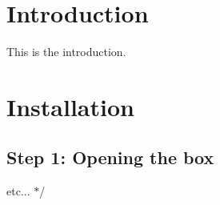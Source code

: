
\begin{DoxyItemize}
\item 
\item 
\end{DoxyItemize}\hypertarget{md_app_main_intro_sec}{}\section{Introduction}\label{md_app_main_intro_sec}

\begin{DoxyItemize}
\item 
\item This is the introduction.
\item 
\item 
\end{DoxyItemize}\hypertarget{md_app_main_install_sec}{}\section{Installation}\label{md_app_main_install_sec}

\begin{DoxyItemize}
\item 
\item 
\end{DoxyItemize}\hypertarget{md_app_main_step1}{}\subsection{Step 1\+: Opening the box}\label{md_app_main_step1}

\begin{DoxyItemize}
\item 
\item etc... $\ast$/ 
\end{DoxyItemize}